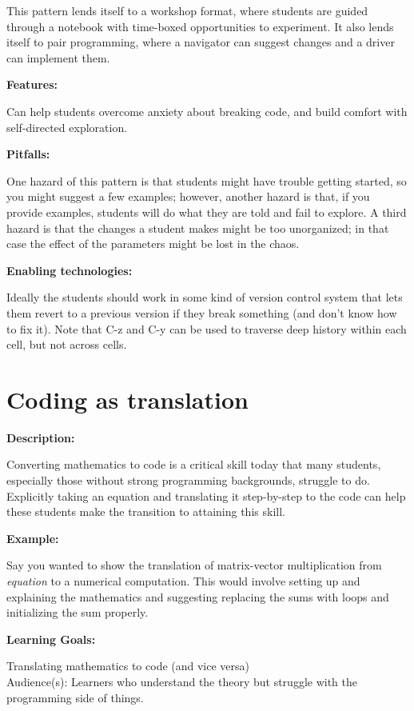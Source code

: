 \documentclass[]{book}
\begin{document}
This pattern lends itself to a workshop format, where students are
guided through a notebook with time-boxed opportunities to experiment.
It also lends itself to pair programming, where a navigator can suggest
changes and a driver can implement them.

\textbf{Features:}

Can help students overcome anxiety about breaking code, and build
comfort with self-directed exploration.

\textbf{Pitfalls:}

One hazard of this pattern is that students might have trouble getting
started, so you might suggest a few examples; however, another hazard is
that, if you provide examples, students will do what they are told and
fail to explore. A third hazard is that the changes a student makes
might be too unorganized; in that case the effect of the parameters
might be lost in the chaos.

\textbf{Enabling technologies:}

Ideally the students should work in some kind of version control system
that lets them revert to a previous version if they break something (and
don't know how to fix it). Note that C-z and C-y can be used to traverse
deep history within each cell, but not across cells.

\section{Coding as translation}\label{coding-as-translation}

\textbf{Description:}

Converting mathematics to code is a critical skill today that many
students, especially those without strong programming backgrounds,
struggle to do. Explicitly taking an equation and translating it
step-by-step to the code can help these students make the transition to
attaining this skill.

\textbf{Example:}

Say you wanted to show the translation of matrix-vector multiplication
from \emph{equation} to a numerical computation. This would involve
setting up and explaining the mathematics and suggesting replacing the
sums with loops and initializing the sum properly.

\textbf{Learning Goals:}

Translating mathematics to code (and vice versa)\\
Audience(s): Learners who understand the theory but struggle with the
programming side of things.
\end{document}
